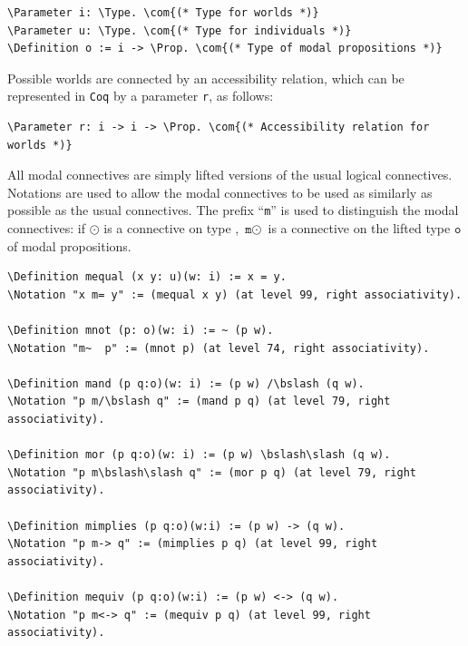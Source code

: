 \documentclass{llncs}
\newcommand{\red}[1]{\textcolor[rgb]{1,0,0}{#1}}
\newcommand{\blue}[1]{\textcolor[rgb]{0,0,1}{#1}}
\newcommand{\brown}[1]{\textcolor[rgb]{0.8,0.6,0.4}{#1}}
\newcommand{\Parameter}{\red{Parameter}}
\newcommand{\Definition}{\red{Definition}}
\newcommand{\Notation}{\blue{Notation}}
\newcommand{\Prop}{\blue{Prop}}
\newcommand{\Type}{\blue{Type}}
\newcommand{\com}[1]{\brown{#1}}
\newcommand{\bslash}{\symbol{92}}
\newcommand{\Coq}{\texttt{Coq}\xspace}
\begin{document}
\newcommand{\verbsize}{\small}

\begin{small}
\begin{Verbatim}[commandchars=\\\{\},fontsize=\verbsize]
\Parameter i: \Type. \com{(* Type for worlds *)}
\Parameter u: \Type. \com{(* Type for individuals *)}
\Definition o := i -> \Prop. \com{(* Type of modal propositions *)}
\end{Verbatim}
\end{small}

\noindent
Possible worlds are connected by an accessibility relation, 
which can be represented in \Coq by a parameter \texttt{r}, as follows:

\begin{small}
\begin{Verbatim}[commandchars=\\\{\},fontsize=\verbsize]
\Parameter r: i -> i -> \Prop. \com{(* Accessibility relation for worlds *)}
\end{Verbatim}
\end{small}


\noindent 
All modal connectives are simply lifted versions of the
usual logical connectives. Notations are used to allow the modal
connectives to be used as similarly as possible as the usual
connectives. The prefix ``\texttt{m}'' is used to distinguish the
modal connectives: if $\odot$ is a connective on type ,
$\texttt{m}\odot$ is a connective on the lifted type $\texttt{o}$ of
modal propositions.

\begin{Verbatim}[commandchars=\\\{\},fontsize=\verbsize]
\Definition mequal (x y: u)(w: i) := x = y.
\Notation "x m= y" := (mequal x y) (at level 99, right associativity).

\Definition mnot (p: o)(w: i) := ~ (p w).
\Notation "m~  p" := (mnot p) (at level 74, right associativity).

\Definition mand (p q:o)(w: i) := (p w) /\bslash (q w).
\Notation "p m/\bslash q" := (mand p q) (at level 79, right associativity).

\Definition mor (p q:o)(w: i) := (p w) \bslash\slash (q w).
\Notation "p m\bslash\slash q" := (mor p q) (at level 79, right associativity).

\Definition mimplies (p q:o)(w:i) := (p w) -> (q w).
\Notation "p m-> q" := (mimplies p q) (at level 99, right associativity).

\Definition mequiv (p q:o)(w:i) := (p w) <-> (q w).
\Notation "p m<-> q" := (mequiv p q) (at level 99, right associativity).
\end{Verbatim}
\end{document}
